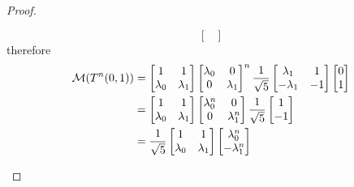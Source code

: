 \documentclass[../main.tex]{subfiles}
\begin{document}
\begin{proof}
\begin{itemize}
\[\begin{bmatrix}
            \end{bmatrix}
          \]
          therefore
          \begin{align*}
            \mathcal{M}(T^n(0, 1)) &=
            \begin{bmatrix}
                1 & 1 \\
                \lambda_0 & \lambda_1 \\
            \end{bmatrix}
            \begin{bmatrix}
              \lambda_0 & 0 \\
              0 & \lambda_1 \\
            \end{bmatrix}^n
            \frac{1}{\sqrt{5}}
            \begin{bmatrix}
              \lambda_1 & 1 \\
              - \lambda_1 & - 1 \\
            \end{bmatrix}
            \begin{bmatrix}
              0 \\ 1
            \end{bmatrix} \\
            &=
            \begin{bmatrix}
              1 & 1 \\
              \lambda_0 & \lambda_1 \\
            \end{bmatrix}
            \begin{bmatrix}
              \lambda_0^n & 0 \\
              0 & \lambda_1^n \\
            \end{bmatrix}
            \frac{1}{\sqrt{5}}
            \begin{bmatrix}
              1 \\ -1
            \end{bmatrix} \\
            &=
            \frac{1}{\sqrt{5}}
            \begin{bmatrix}
              1 & 1 \\
              \lambda_0 & \lambda_1 \\
            \end{bmatrix}
            \begin{bmatrix}
              \lambda_0^n \\ - \lambda_1^n

\end{bmatrix}
\end{align*}
\end{itemize}
\end{proof}
\end{document}
